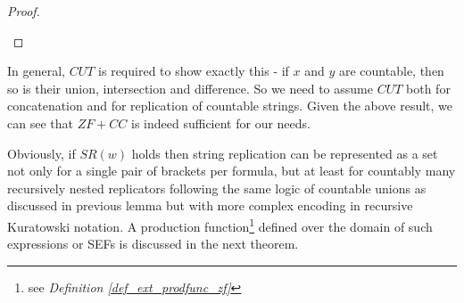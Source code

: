 \begin{proof}
\begin{enumerate}
    \end{enumerate}
\end{proof}

In general, $CUT$ is required to show exactly this - if $x$ and $y$ are countable, then so is their union, intersection and difference. So we need to assume $CUT$ both for concatenation and for replication of countable strings. Given the above result, we can see that $ZF + CC$ 
is indeed sufficient for our needs.

Obviously, if $SR(w)$ holds then string replication can be represented as a set not only for a single pair of brackets per formula, but at least for countably many recursively nested replicators following the same logic of countable unions as discussed in previous lemma but with more complex encoding in recursive Kuratowski notation. A production function\footnote{see \textit{Definition \ref{def_ext_prodfunc_zf}}} defined over the domain of such expressions or SEFs is discussed in the next theorem.



